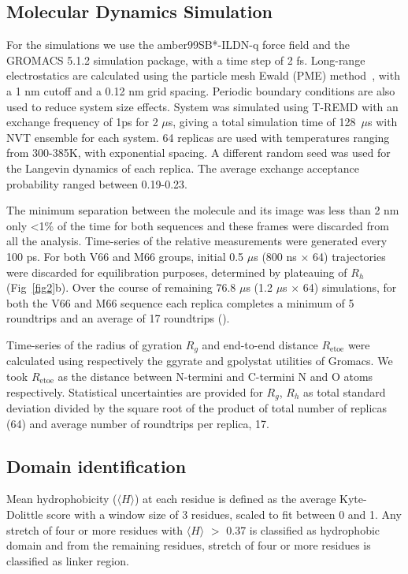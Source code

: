 \documentclass[10pt,letterpaper]{article}
\begin{document}
\subsection*{Molecular Dynamics Simulation} For the simulations we use the amber99SB*-ILDN-q force field\cite{Lindorff-Larsen2010a, Hornak2006a} and the GROMACS 5.1.2 simulation package,\cite{Berendsen1995,Abraham2015} with a time step of 2 fs. Long-range electrostatics are calculated using the particle mesh Ewald (PME) method~\cite{Essmann1995}, with a 1 nm cutoff and a 0.12 nm grid spacing. Periodic boundary conditions are also used to reduce system size effects. System was simulated using T-REMD\cite{Sugita1999a} with an exchange frequency of 1ps for 2 $\mu$s, giving a total simulation time of 128~$\mu$s with NVT ensemble for each system. 64 replicas are used with temperatures ranging from 300-385K, with exponential spacing. A different random seed was used for the Langevin dynamics of each replica. The average exchange acceptance probability ranged between 0.19-0.23. 

The minimum separation between the molecule and its image was less than 2 nm only \textless 1\% of the time for both sequences and these frames were discarded from all the analysis. Time-series of the relative measurements were generated every 100 ps. For both V66 and M66 groups, initial 0.5 $\mu$s (800 ns $\times$ 64) trajectories were discarded for equilibration purposes, determined by plateauing of $R_h$ (Fig~\ref{fig2}b). Over the course of remaining 76.8 $\mu$s (1.2 $\mu$s $\times$ 64) simulations, for both the V66 and M66 sequence each replica completes a minimum of 5 roundtrips and an average of 17 roundtrips (). 
 
Time-series of the radius of gyration $R_g$ and end-to-end distance $R_{\mathrm{etoe}}$ were calculated using respectively the g\textunderscore gyrate and g\textunderscore polystat utilities of Gromacs. We took $R_{\mathrm{etoe}}$ as the distance between N-termini and C-termini N and O atoms respectively. Statistical uncertainties are provided for $R_g$, $R_h$ as total standard deviation divided by the square root of the product of total number of replicas (64) and average number of roundtrips per replica, 17.  

\subsection*{Domain identification} Mean hydrophobicity ($\langle H\rangle$) at each residue is defined as the average Kyte-Dolittle\cite{Kyte1982a} score with a window size of 3 residues, scaled to fit between 0 and 1. Any stretch of four or more residues with $\langle H \rangle$ $>$ 0.37 is classified as hydrophobic domain and from the remaining residues, stretch of four or more residues is classified as linker region.
\end{document}
